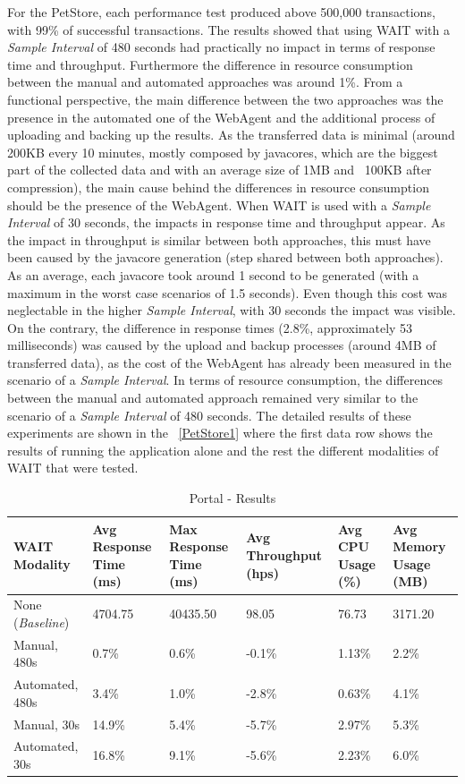 \documentclass[runningheads,a4paper]{llncs}
\begin{document}
For the PetStore, each performance test produced above 500,000 transactions,
with 99\% of successful transactions. The results showed that using WAIT with a
\emph{Sample Interval} of 480 seconds had practically no impact in terms of response 
time and throughput. Furthermore the difference in resource consumption between
the manual and automated approaches was around 1\%. From a functional perspective, the main 
difference between the two approaches was the presence in the automated one of
the WebAgent and the additional process of uploading and backing up the results. As the 
transferred data is minimal (around 200KB every 10 minutes, mostly composed by
javacores, which are the biggest part of the collected data and with an average size of 1MB 
and ~100KB after compression), the main cause behind the differences in resource
consumption should be the presence of the WebAgent. When WAIT is used with a \emph{Sample Interval} 
of 30 seconds, the impacts in response time and throughput appear. As the impact in throughput is
similar between both approaches, this must have been caused by the javacore
generation (step shared between both approaches). As an average, each javacore took around
1 second to be generated (with a maximum in the worst case scenarios of 1.5
seconds). Even though this cost was neglectable in the higher \emph{Sample
Interval}, with 30 seconds the impact was visible. On the contrary, the difference in response times (2.8\%, approximately 53 milliseconds) was caused by the upload
and backup processes (around 4MB of transferred data), as the cost of the
WebAgent has already been measured in the scenario of a \emph{Sample Interval}.
In terms of resource consumption, the differences between the manual and
automated approach remained very similar to the scenario of a \emph{Sample
Interval} of 480 seconds. The detailed results of these experiments are shown in the \tablename
~\ref{PetStore1} where the first data row shows the results of running the
application alone and the rest the different modalities of WAIT that were
tested.

\begin{table}[!h]
\caption{Portal - Results}
\label{Portal1}
\centering
\begin{tabular}{p{}|p{}|p{}|p{}|p{}|p{}}
\hline
\bfseries WAIT Modality & \bfseries Avg Response Time (ms)& \bfseries Max
Response Time (ms)& \bfseries Avg Throughput (hps)& \bfseries Avg CPU Usage
(\%) & \bfseries Avg Memory Usage (MB)\\
\hline
None (\emph{Baseline}) 	& 4704.75	& 40435.50	& 98.05 	& 76.73 	& 3171.20\\
Manual, 480s 			& 0.7\% 	& 0.6\%		& -0.1\%	& 1.13\% 	& 2.2\%\\
Automated, 480s 		& 3.4\%		& 1.0\%		& -2.8\% 	& 0.63\% 	& 4.1\%\\
Manual, 30s 			& 14.9\%	& 5.4\%		& -5.7\% 	& 2.97\% 	& 5.3\%\\
Automated, 30s 			& 16.8\%	& 9.1\%		& -5.6\% 	& 2.23\% 	& 6.0\%\\
\hline
\end{tabular}
\end{table}
\end{document}
